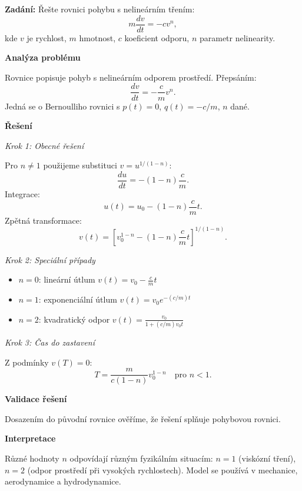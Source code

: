 \vspace{2\baselineskip}

\begin{example}
\label{ex:c3-nelinearni-tlumeni}

\noindent\textbf{Zadání:} Řešte rovnici pohybu s nelineárním třením:
\[
m\frac{dv}{dt} = -cv^n,
\]
kde $v$ je rychlost, $m$ hmotnost, $c$ koeficient odporu, $n$ parametr nelinearity.

\vspace{1.5\baselineskip}

\noindent\textbf{Analýza problému}

\noindent Rovnice popisuje pohyb s nelineárním odporem prostředí. Přepsáním:
\[
\frac{dv}{dt} = -\frac{c}{m}v^n.
\]
Jedná se o Bernoulliho rovnici s $p(t) = 0$, $q(t) = -c/m$, $n$ dané.

\vspace{1.5\baselineskip}

\noindent\textbf{Řešení}

\noindent\textit{Krok 1: Obecné řešení}

Pro $n \neq 1$ použijeme substituci $v = u^{1/(1-n)}$:
\[
\frac{du}{dt} = -(1-n)\frac{c}{m}.
\]
Integrace:
\[
u(t) = u_0 - (1-n)\frac{c}{m}t.
\]
Zpětná transformace:
\[
v(t) = \left[ v_0^{1-n} - (1-n)\frac{c}{m}t \right]^{1/(1-n)}. \tag{1}
\]

\noindent\textit{Krok 2: Speciální případy}

\begin{itemize}
\item $n = 0$: lineární útlum $v(t) = v_0 - \frac{c}{m}t$
\item $n = 1$: exponenciální útlum $v(t) = v_0 e^{-(c/m)t}$
\item $n = 2$: kvadratický odpor $v(t) = \frac{v_0}{1 + (c/m)v_0 t}$
\end{itemize}

\noindent\textit{Krok 3: Čas do zastavení}

Z podmínky $v(T) = 0$:
\[
T = \frac{m}{c(1-n)}v_0^{1-n} \quad \text{pro } n < 1.
\]

\vspace{1.5\baselineskip}

\noindent\textbf{Validace řešení}

Dosazením do původní rovnice ověříme, že řešení splňuje pohybovou rovnici.

\vspace{1.5\baselineskip}

\noindent\textbf{Interpretace}

Různé hodnoty $n$ odpovídají různým fyzikálním situacím: $n = 1$ (viskózní tření), 
$n = 2$ (odpor prostředí při vysokých rychlostech). Model se používá v mechanice, 
aerodynamice a hydrodynamice.

\end{example}

